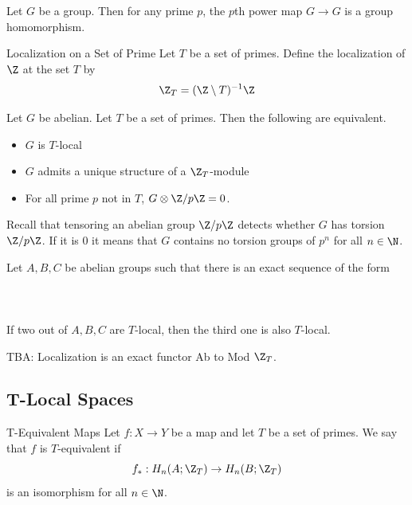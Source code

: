 \documentclass[a4paper]{article}
\begin{document}
\begin{lmm}{}{} Let $G$ be a group. Then for any prime $p$, the $p$th power map $G\to G$ is a group homomorphism. 
\end{lmm}

\begin{defn}{Localization on a Set of Prime}{} Let $T$ be a set of primes. Define the localization of $\Z$ at the set $T$ by $$\Z_T=(\Z\setminus T)^{-1}\Z$$
\end{defn}

\begin{prp}{}{} Let $G$ be abelian. Let $T$ be a set of primes. Then the following are equivalent. 
\begin{itemize}
\item $G$ is $T$-local
\item $G$ admits a unique structure of a $\Z_T$-module
\item For all prime $p$ not in $T$, $G\otimes\Z/p\Z=0$. 
\end{itemize}
\end{prp}

Recall that tensoring an abelian group $\Z/p\Z$ detects whether $G$ has torsion $\Z/p\Z$. If it is $0$ it means that $G$ contains no torsion groups of $p^n$ for all $n\in\N$. 

\begin{lmm}{}{} Let $A,B,C$ be abelian groups such that there is an exact sequence of the form \\~\\
\\~\\
If two out of $A,B,C$ are $T$-local, then the third one is also $T$-local. 
\end{lmm}

TBA: Localization is an exact functor Ab to Mod $\Z_T$. 

\subsection{T-Local Spaces}
\begin{defn}{T-Equivalent Maps}{} Let $f:X\to Y$ be a map and let $T$ be a set of primes. We say that $f$ is $T$-equivalent if $$f_\ast:H_n(A;\Z_T)\to H_n(B;\Z_T)$$ is an isomorphism for all $n\in\N$. 
\end{defn}
\end{document}
